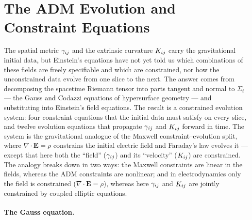 \section{The ADM Evolution and Constraint Equations}
\label{sec:adm-equations}

The spatial metric $\gamma_{ij}$ and the extrinsic curvature $K_{ij}$
carry the gravitational initial data, but Einstein's equations have not yet
told us which combinations of these fields are freely specifiable and which
are constrained, nor how the unconstrained data evolve from one slice to the
next.  The answer comes from decomposing the spacetime Riemann tensor into
parts tangent and normal to $\Sigma_t$ --- the Gauss and Codazzi equations
of hypersurface geometry --- and substituting into Einstein's field
equations.  The result is a constrained evolution system: four constraint
equations that the initial data must satisfy on every slice, and twelve
evolution equations that propagate $\gamma_{ij}$ and $K_{ij}$
forward in time.  The system is the gravitational analogue of the
Maxwell constraint--evolution split, where $\nabla \cdot \mathbf{E} = \rho$
constrains the initial electric field and Faraday's law evolves it ---
except that here both the ``field'' ($\gamma_{ij}$) and its ``velocity''
($K_{ij}$) are constrained.  The analogy breaks down in two ways: the
Maxwell constraints are linear in the fields, whereas the ADM constraints
are nonlinear; and in electrodynamics only the field is constrained
($\nabla \cdot \mathbf{E} = \rho$), whereas here $\gamma_{ij}$ and
$K_{ij}$ are jointly constrained by coupled elliptic equations.

\paragraph{The Gauss equation.}

